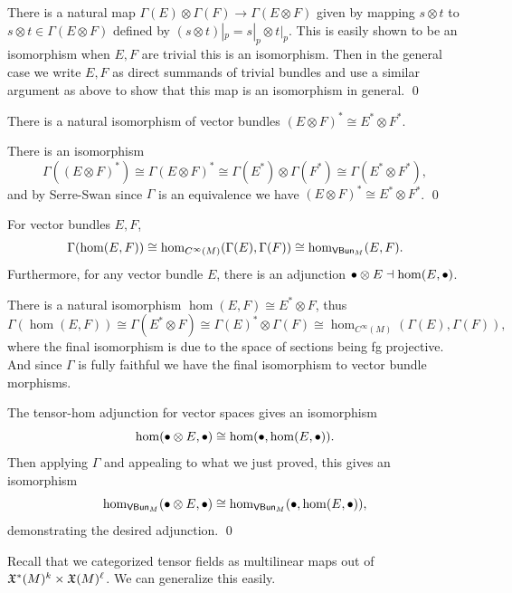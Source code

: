 \eprop

\bproof

    There is a natural map $\Gamma(E)\otimes\Gamma(F)\to\Gamma(E\otimes F)$ given by mapping $s\otimes t$ to $s\otimes t\in\Gamma(E\otimes F)$ defined by
    $(s\otimes t)|_p=s|_p\otimes t|_p$.
    This is easily shown to be an isomorphism when $E,F$ are trivial this is an isomorphism.
    Then in the general case we write $E,F$ as direct summands of trivial bundles and use a similar argument as above to show that this map is an isomorphism
    in general.
    \qed

\eproof

\bcoro

    There is a natural isomorphism of vector bundles $(E\otimes F)^*\cong E^*\otimes F^*$.

\ecoro

\bproof

    There is an isomorphism
    $$ \Gamma((E\otimes F)^*) \cong \Gamma(E\otimes F)^* \cong \Gamma(E^*)\otimes\Gamma(F^*) \cong \Gamma(E^*\otimes F^*) , $$
    and by Serre-Swan since $\Gamma$ is an equivalence we have $(E\otimes F)^*\cong E^*\otimes F^*$.
    \qed

\eproof

\bcoro

    For vector bundles $E,F$,
    $$ \Gamma(\hom(E,F)) \cong \hom_{C^\infty(M)}(\Gamma(E),\Gamma(F)) \cong \hom_{{\sf VBun}_M}(E,F) . $$
    Furthermore, for any vector bundle $E$, there is an adjunction $\bullet\otimes E\dashv\hom(E,\bullet)$.

\ecoro

\bproof

    There is a natural isomorphism $\hom(E,F)\cong E^*\otimes F$, thus
    $$ \Gamma(\hom(E,F)) \cong \Gamma(E^*\otimes F) \cong \Gamma(E)^*\otimes\Gamma(F) \cong \hom_{C^\infty(M)}(\Gamma(E),\Gamma(F)) , $$
    where the final isomorphism is due to the space of sections being fg projective.
    And since $\Gamma$ is fully faithful we have the final isomorphism to vector bundle morphisms.

    The tensor-hom adjunction for vector spaces gives an isomorphism
    $$ \hom(\bullet\otimes E,\bullet) \cong \hom(\bullet,\hom(E,\bullet)) . $$
    Then applying $\Gamma$ and appealing to what we just proved, this gives an isomorphism
    $$ \hom_{{\sf VBun}_M}(\bullet\otimes E,\bullet) \cong \hom_{{\sf VBun}_M}(\bullet,\hom(E,\bullet)) , $$
    demonstrating the desired adjunction.
    \qed

\eproof

Recall that we categorized tensor fields as multilinear maps out of ${\frak X}^*(M)^k\times{\frak X}(M)^\ell$.
We can generalize this easily.

